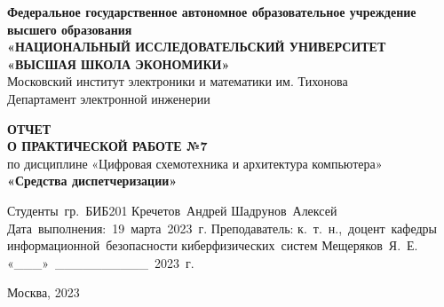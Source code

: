 \begin{titlepage}
    \begin{center}

        \timesfont
        {\large\bf\timesfont Федеральное‌ ‌государственное‌ ‌автономное‌ ‌образовательное‌ ‌учреждение‌ ‌высшего‌ образования\\}
        {\large\bf\timesfont «НАЦИОНАЛЬНЫЙ‌ ‌ИССЛЕДОВАТЕЛЬСКИЙ‌ ‌УНИВЕРСИТЕТ‌ «ВЫСШАЯ‌ ‌ШКОЛА‌ ‌ЭКОНОМИКИ»‌\\}
        Московский‌ ‌институт‌ ‌электроники‌ ‌и‌ ‌математики‌ ‌им. Тихонова‌\\
        Департамент‌ ‌электронной‌ ‌инженерии‌\\

        \vfill
        \vfill

        {\bf\timesfont ОТЧЕТ \\
            О ПРАКТИЧЕСКОЙ РАБОТЕ №7}\\
        по дисциплине «Цифровая схемотехника и архитектура компьютера»\\
        {\bf\timesfont «Средства диспетчеризации»}\\


        \vfill
        \vfill
        \vfill

        \hfill\vbox
        {
            \hbox{Студенты гр. БИБ201}
            \hbox{Кречетов Андрей}
            \hbox{Шадрунов Алексей}
            \hbox{Дата выполнения: 19 марта 2023 г.}
            \hbox{}
            \hbox{Преподаватель:}
            \hbox{к. т. н., доцент кафедры}
            \hbox{информационной безопасности}
            \hbox{киберфизических систем}
            \hbox{Мещеряков Я. Е.}
            \hbox{«\_\_\_» \_\_\_\_\_\_\_\_\_\_ 2023 г.}
        }

        \vfill

        Москва, 2023
    \end{center}
\end{titlepage}
